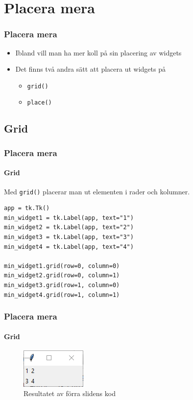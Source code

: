 \documentclass[aspectratio=169]{beamer}
\begin{document}
\section{Placera mera}

\begin{frame}
	\frametitle{Placera mera}
	
	\begin{itemize}
		\item Ibland vill man ha mer koll på sin placering av widgets
		\item Det finns två andra sätt att placera ut widgets på
		\begin{itemize}
			\item \lstinline{grid()}
			\item \lstinline{place()}
		\end{itemize}
	\end{itemize}

\end{frame}

\subsection{Grid}

\begin{frame}[fragile]
	\frametitle{Placera mera}
	\framesubtitle{Grid}
	
	Med \lstinline{grid()} placerar man ut elementen i rader och kolumner.
	
	\begin{lstlisting}
app = tk.Tk()
min_widget1 = tk.Label(app, text="1")
min_widget2 = tk.Label(app, text="2")
min_widget3 = tk.Label(app, text="3")
min_widget4 = tk.Label(app, text="4")

min_widget1.grid(row=0, column=0)
min_widget2.grid(row=0, column=1)
min_widget3.grid(row=1, column=0)
min_widget4.grid(row=1, column=1)
	\end{lstlisting}

\end{frame}

\begin{frame}
	\frametitle{Placera mera}
	\framesubtitle{Grid}
	
	\begin{figure}
		\includegraphics{grid-visa.png}
		\caption{Resultatet av förra slidens kod}
	\end{figure}
	
\end{frame}
\end{document}
